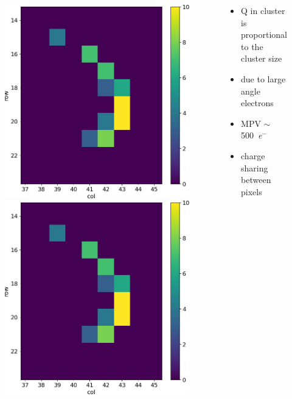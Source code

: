 \begin{frame}
\begin{columns}
\begin{figure}
                    \includegraphics[width=.3\linewidth]{figures/charaterization/evts/Sr90/10b.png} 
                    \includegraphics[width=.3\linewidth]{figures/charaterization/evts/Sr90/10b.png}
                \end{figure}
                \begin{itemize}
                    \item Q in cluster is proportional to the cluster size
                    \item due to large angle electrons
                    \item MPV $\sim$\SI{500}{\elementarycharge}$^-$
                    \item charge sharing between pixels 
                \end{itemize}
        \end{columns}
    \end{frame}    

